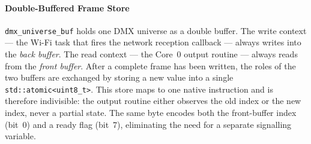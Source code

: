 \paragraph{Double-Buffered Frame Store}
\texttt{dmx\_universe\_buf} holds one \ac{DMX} universe as a double buffer.
The write context — the Wi-Fi task that fires the network reception callback — always writes into the \emph{back buffer}.
The read context — the Core~0 output routine — always reads from the \emph{front buffer}.
After a complete frame has been written, the roles of the two buffers are exchanged by storing a new value into a single \texttt{std::atomic<uint8\_t>}.
This store maps to one native instruction and is therefore indivisible: the output routine either observes the old index or the new index, never a partial state.
The same byte encodes both the front-buffer index (bit~0) and a ready flag (bit~7), eliminating the need for a separate signalling variable.

